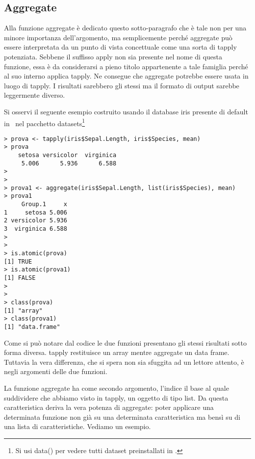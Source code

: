 \subsection{Aggregate}

Alla funzione aggregate è dedicato questo sotto-paragrafo che è tale non per una minore importanza dell'argomento, ma semplicemente perché aggregate può essere interpretata da un punto di vista concettuale come una sorta di tapply potenziata. Sebbene il suffisso apply non sia presente nel nome di questa funzione, essa è da considerarsi a pieno titolo appartenente a tale famiglia perché al suo interno applica tapply. Ne consegue che aggregate potrebbe essere usata in luogo di tapply. I risultati sarebbero gli stessi ma il formato di output sarebbe leggermente diverso.

Si osservi il seguente esempio costruito usando il database iris presente di default in \erre\ nel pacchetto datasets\footnote{Si usi data() per vedere tutti dataset preinstallati in \erre. }
\begin{lstlisting}	
> prova <- tapply(iris$Sepal.Length, iris$Species, mean)
> prova
    setosa versicolor  virginica 
     5.006      5.936      6.588 
>
>
> prova1 <- aggregate(iris$Sepal.Length, list(iris$Species), mean)
> prova1
     Group.1     x
1     setosa 5.006
2 versicolor 5.936
3  virginica 6.588
>
>
> is.atomic(prova)
[1] TRUE
> is.atomic(prova1)
[1] FALSE
>
>
> class(prova)
[1] "array"
> class(prova1)
[1] "data.frame"
\end{lstlisting}

Come si può notare dal codice le due funzioni presentano gli stessi risultati sotto forma diversa. tapply restituisce un array mentre aggregate un data frame. Tuttavia la vera differenza, che si spera non sia sfuggita ad un lettore attento, è negli argomenti delle due funzioni.

La funzione aggregate ha come secondo argomento, l'indice il base al quale suddividere che abbiamo visto in tapply, un oggetto di tipo list. Da questa caratteristica deriva la vera potenza di aggregate: poter applicare una determinata funzione non già su una determinata caratteristica ma bensì su di una lista di caratteristiche. Vediamo un esempio.

